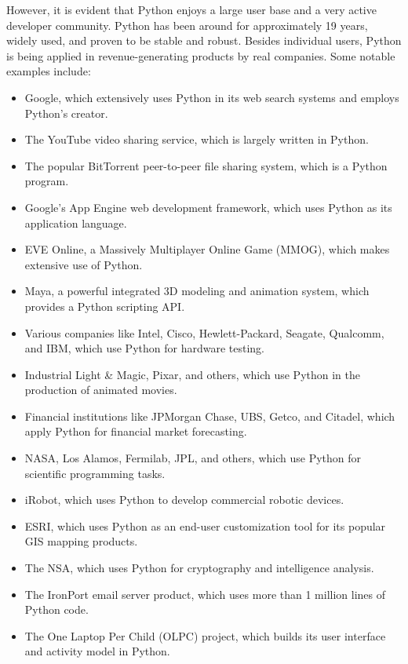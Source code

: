 \documentclass[12pt]{book}
\begin{document}
However, it is evident that Python enjoys a large user base and a very active developer community. Python has been around for approximately 19 years, widely used, and proven to be stable and robust. Besides individual users, Python is being applied in revenue-generating products by real companies. Some notable examples include:

\begin{itemize}
  \item Google, which extensively uses Python in its web search systems and employs Python's creator.
  \item The YouTube video sharing service, which is largely written in Python.
  \item The popular BitTorrent peer-to-peer file sharing system, which is a Python program.
  \item Google's App Engine web development framework, which uses Python as its application language.
  \item EVE Online, a Massively Multiplayer Online Game (MMOG), which makes extensive use of Python.
  \item Maya, a powerful integrated 3D modeling and animation system, which provides a Python scripting API.
  \item Various companies like Intel, Cisco, Hewlett-Packard, Seagate, Qualcomm, and IBM, which use Python for hardware testing.
  \item Industrial Light \& Magic, Pixar, and others, which use Python in the production of animated movies.
  \item Financial institutions like JPMorgan Chase, UBS, Getco, and Citadel, which apply Python for financial market forecasting.
  \item NASA, Los Alamos, Fermilab, JPL, and others, which use Python for scientific programming tasks.
  \item iRobot, which uses Python to develop commercial robotic devices.
  \item ESRI, which uses Python as an end-user customization tool for its popular GIS mapping products.
  \item The NSA, which uses Python for cryptography and intelligence analysis.
  \item The IronPort email server product, which uses more than 1 million lines of Python code.
  \item The One Laptop Per Child (OLPC) project, which builds its user interface and activity model in Python.
\end{itemize}
\end{document}
